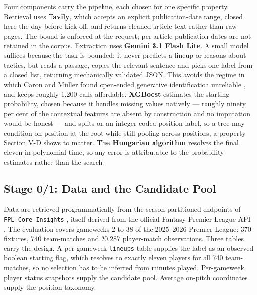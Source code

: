 \documentclass[conference]{IEEEtran}
\begin{document}
Four components carry the pipeline, each chosen for one specific property. Retrieval uses \textbf{Tavily}, which accepts an explicit publication-date range, closed here the day before kick-off, and returns cleaned article text rather than raw pages. The bound is enforced at the request; per-article publication dates are not retained in the corpus. Extraction uses \textbf{Gemini 3.1 Flash Lite}. A small model suffices because the task is bounded: it never predicts a lineup or reasons about tactics, but reads a passage, copies the relevant sentence and picks one label from a closed list, returning mechanically validated JSON. This avoids the regime in which Caron and M\"uller found open-ended generative identification unreliable \cite{caronmueller2023}, and keeps roughly 1{,}200 calls affordable. \textbf{XGBoost} \cite{chenguestrin2016} estimates the starting probability, chosen because it handles missing values natively --- roughly ninety per cent of the contextual features are absent by construction and no imputation would be honest --- and splits on an integer-coded position label, so a tree may condition on position at the root while still pooling across positions, a property Section V-D shows to matter. \textbf{The Hungarian algorithm} \cite{kuhn1955} resolves the final eleven in polynomial time, so any error is attributable to the probability estimates rather than the search.

\subsection{Stage 0/1: Data and the Candidate Pool}

Data are retrieved programmatically from the season-partitioned endpoints of \texttt{FPL-Core-Insights} \cite{fpleloinsights}, itself derived from the official Fantasy Premier League API \cite{fplapi}. The evaluation covers gameweeks 2 to 38 of the 2025--2026 Premier League: 370 fixtures, 740 team-matches and 20{,}287 player-match observations. Three tables carry the design. A per-gameweek \texttt{lineups} table supplies the label as an observed boolean starting flag, which resolves to exactly eleven players for all 740 team-matches, so no selection has to be inferred from minutes played. Per-gameweek player status snapshots supply the candidate pool. Average on-pitch coordinates supply the position taxonomy.
\end{document}
